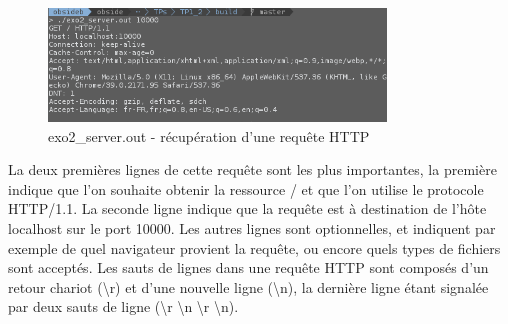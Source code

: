 \begin{figure}[h!]
	\centering
	\includegraphics[width=0.8\textwidth]{screenshots/ex2.png}
	\caption{exo2\_server.out - récupération d'une requête HTTP}
\end{figure}

La deux premières lignes de cette requête sont les plus importantes, la première indique que l'on souhaite obtenir la ressource / et que l'on utilise le protocole HTTP/1.1. La seconde ligne indique que la requête est à destination de l'hôte localhost sur le port 10000. Les autres lignes sont optionnelles, et indiquent par exemple de quel navigateur provient la requête, ou encore quels types de fichiers sont acceptés. Les sauts de lignes dans une requête HTTP sont composés d'un retour chariot (\textbackslash r) et d'une nouvelle ligne (\textbackslash n), la dernière ligne étant signalée par deux sauts de ligne (\textbackslash r \textbackslash n \textbackslash r \textbackslash n).
